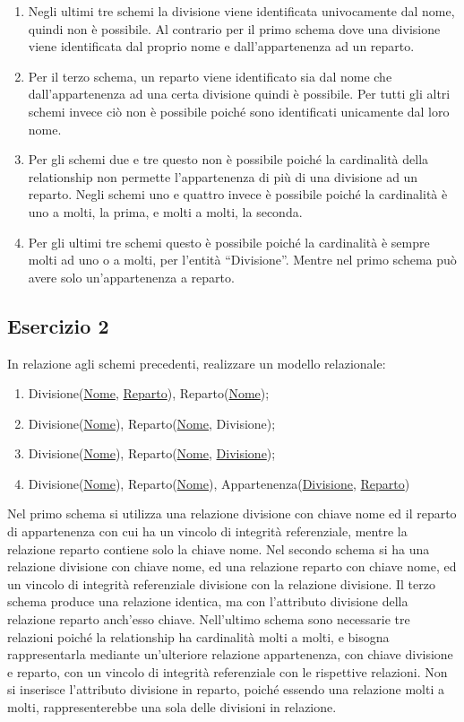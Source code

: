 \documentclass{article}
\numberwithin{equation}{subsection}
\begin{document}
\begin{enumerate}
    \item Negli ultimi tre schemi la divisione viene identificata univocamente dal nome, quindi non è possibile. Al contrario per il primo schema dove una divisione viene identificata dal proprio nome e dall'appartenenza ad un reparto. 
    \item Per il terzo schema, un reparto viene identificato sia dal nome che dall'appartenenza ad una certa divisione quindi è possibile. Per tutti gli altri schemi invece ciò non è possibile poiché sono identificati unicamente dal loro nome. 
    \item Per gli schemi due e tre questo non è possibile poiché la cardinalità della relationship non permette l'appartenenza di più di una divisione ad un reparto. Negli schemi uno e quattro invece è possibile poiché la cardinalità è uno a molti, la prima, e molti a molti, la seconda. 
    \item Per gli ultimi tre schemi questo è possibile poiché la cardinalità è sempre molti ad uno o a molti, per l'entità ``Divisione''. Mentre nel primo schema può avere solo un'appartenenza a reparto. 
\end{enumerate}

\subsection{Esercizio 2}

In relazione agli schemi precedenti, realizzare un modello relazionale:
\begin{enumerate}
    \item Divisione(\underline{Nome}, \underline{Reparto}), Reparto(\underline{Nome});
    \item Divisione(\underline{Nome}), Reparto(\underline{Nome}, Divisione);
    \item Divisione(\underline{Nome}), Reparto(\underline{Nome}, \underline{Divisione});
    \item Divisione(\underline{Nome}), Reparto(\underline{Nome}), Appartenenza(\underline{Divisione}, \underline{Reparto})
\end{enumerate}

Nel primo schema si utilizza una relazione divisione con chiave nome ed il reparto di appartenenza con cui ha un vincolo di integrità referenziale, 
mentre la relazione reparto contiene solo la chiave nome. Nel secondo schema si ha una relazione divisione con chiave nome, ed una relazione reparto 
con chiave nome, ed un vincolo di integrità referenziale divisione con la relazione divisione. Il terzo schema produce una relazione identica, 
ma con l'attributo divisione della relazione reparto anch'esso chiave. Nell'ultimo schema sono necessarie tre relazioni poiché la relationship ha 
cardinalità molti a molti, e bisogna rappresentarla mediante un'ulteriore relazione appartenenza, con chiave divisione e reparto, con un 
vincolo di integrità referenziale con le rispettive relazioni. Non si inserisce l'attributo divisione in reparto, poiché essendo una relazione 
molti a molti, rappresenterebbe una sola delle divisioni in relazione. 
\end{document}
